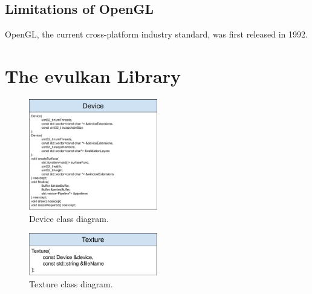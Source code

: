 \documentclass[12pt]{report}
\newcommand{\figurewidth}{0.6\textwidth}
\newcommand{\imagewidth}{0.5\textwidth}
\theoremstyle{definition}
\begin{document}
    \section{Limitations of OpenGL}
    OpenGL, the current cross-platform industry standard, was first released in 1992.

  \chapter{The evulkan Library}

  \lipsum[1]

  \begin{figure}
    \centering
    \includegraphics[width=\imagewidth]{images/class_device.png}
    \caption{Device class diagram.}
    \label{fig:class_device}  
  \end{figure}

  \begin{figure}
    \centering
    \includegraphics[width=\imagewidth]{images/class_texture.png}
    \caption{Texture class diagram.}
    \label{fig:class_texture}  
  \end{figure}
\end{document}
